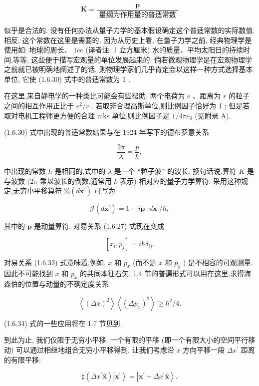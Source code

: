 \documentclass[lang=cn,newtx,10pt,scheme=chinese,thmcnt=section]{elegantbook}
\begin{document}
$$
\mathbf{K} = \frac{\mathbf{p}}{\text{ 量纲为作用量的普适常数 }} \tag{1.6.30}
$$

似乎是合法的. 没有任何办法从量子力学的基本假设确定这个普适常数的实际数值. 相反, 这个常数在这里是需要的, 因为从历史上看, 在量子力学之前, 经典物理学是使用如: 地球的周长、 $1\mathrm{{cc}}$ (译者注: 1 立方厘米) 水的质量、平均太阳日的持续时间,等等, 这些便于描写宏观量的单位发展起来的. 倘若微观物理学是在宏观物理学之前就已被明确地阐述了的话, 则物理学家们几乎肯定会以这样一种方式选择基本单位, 它使 (1.6.30) 式中的普适常数为 1 .

在这里,来自静电学的一种类比可能会有些帮助. 两个电荷为 $e$ 、距离为 $r$ 的粒子之间的相互作用正比于 ${e}^{2}/r$ . 若取非合理高斯单位,则比例因子恰好为 1 ; 但是若取对电机工程师更方便的合理 $\mathrm{{mks}}$ 单位,则比例因子是 $1/{4\pi }{\varepsilon }_{0}$ (见附录 A).

(1.6.30) 式中出现的普适常数结果与在 1924 年写下的德布罗意关系

$$
\frac{2\pi }{\lambda } = \frac{p}{\hbar }, \tag{1.6.31}
$$

中出现的常数 $h$ 是相同的,式中的 $\lambda$ 是一个 “粒子波” 的波长. 换句话说,算符 $K$ 是与波数 $({2\pi }$ 乘以波长的倒数,通常用 $k$ 表示) 相对应的量子力学算符. 采用这种规定,无穷小平移算符 $\% \left( {d{\mathbf{x}}^{\prime }}\right)$ 可写为

$$
\mathcal{J}\left( {d{\mathbf{x}}^{\prime }}\right) = 1 - i\mathbf{p} \cdot d{\mathbf{x}}^{\prime }/\hbar , \tag{1.6.32}
$$

其中的 $\mathbf{p}$ 是动量算符. 对易关系 (1.6.27) 式现在变成

$$
\left\lbrack {{x}_{i},{p}_{j}}\right\rbrack = i\hbar {\delta }_{ij}. \tag{1.6.33}
$$

对易关系 (1.6.33) 式意味着,例如, $x$ 和 ${p}_{x}$ (而不是 $x$ 和 ${p}_{y}$ ) 是不相容的可观测量. 因此不可能找到 $x$ 和 ${p}_{x}$ 的共同本征右矢. 1.4 节的普遍形式可以用在这里,求得海森伯的位置与动量的不确定度关系

$$
\left\langle {\left( \Delta x\right) }^{2}\right\rangle \left\langle {\left( \Delta {p}_{x}\right) }^{2}\right\rangle \geq {\hbar }^{2}/4. \tag{1. 6.34}
$$

(1.6.34) 式的一些应用将在 1.7 节见到.

到此为止, 我们仅限于无穷小平移. 一个有限的平移 (即一个有限大小的空间平行移动) 可以通过相继地组合无穷小平移得到. 让我们考虑沿 $x$ 方向平移一段 $\Delta {x}^{\prime }$ 距离的有限平移:

$$
\sharp \left( {\Delta {x}^{\prime }\widehat{\mathbf{x}}}\right) \left| {\mathbf{x}}^{\prime }\right\rangle = \left| {{\mathbf{x}}^{\prime } + \Delta {x}^{\prime }\widehat{\mathbf{x}}}\right\rangle . \tag{1.6.35}
$$
\end{document}
